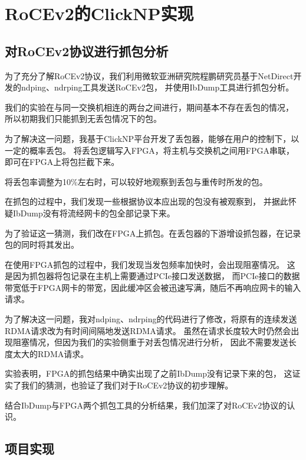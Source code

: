 \chapter{RoCEv2的ClickNP实现}
\section{对RoCEv2协议进行抓包分析}
为了充分了解RoCEv2协议，我们利用微软亚洲研究院程鹏研究员基于NetDirect开发的ndping、ndrping工具发送RoCEv2包，
并使用IbDump工具进行抓包分析。

我们的实验在与同一交换机相连的两台之间进行，期间基本不存在丢包的情况，
所以初期我们只能抓到无丢包情况下的包。

为了解决这一问题，我基于ClickNP平台开发了丢包器，能够在用户的控制下，以一定的概率丢包。
将丢包逻辑写入FPGA，将主机与交换机之间用FPGA串联，即可在FPGA上将包拦截下来。

将丢包率调整为10\%左右时，可以较好地观察到丢包与重传时所发的包。

在抓包的过程中，我们发现一些根据协议本应出现的包没有被观察到，
并据此怀疑IbDump没有将流经网卡的包全部记录下来。

为了验证这一猜测，我们改在FPGA上抓包。在丢包器的下游增设抓包器，在记录包的同时将其发出。

在使用FPGA抓包的过程中，我们发现当发包频率加快时，会出现阻塞情况。
这是因为抓包器将包记录在主机上需要通过PCIe接口发送数据，
而PCIe接口的数据带宽低于FPGA网卡的带宽，因此缓冲区会被迅速写满，随后不再响应网卡的输入请求。

为了解决这一问题，我对ndping、ndrping的代码进行了修改，将原有的连续发送RDMA请求改为有时间间隔地发送RDMA请求。
虽然在请求长度较大时仍然会出现阻塞情况，但因为我们的实验侧重于对丢包情况进行分析，
因此不需要发送长度太大的RDMA请求。

实验表明，FPGA的抓包结果中确实出现了之前IbDump没有记录下来的包，
这证实了我们的猜测，也验证了我们对于RoCEv2协议的初步理解。

结合IbDump与FPGA两个抓包工具的分析结果，我们加深了对RoCEv2协议的认识。

\begin{figure}[htbp]
\centering

\end{figure}
\section{项目实现}
